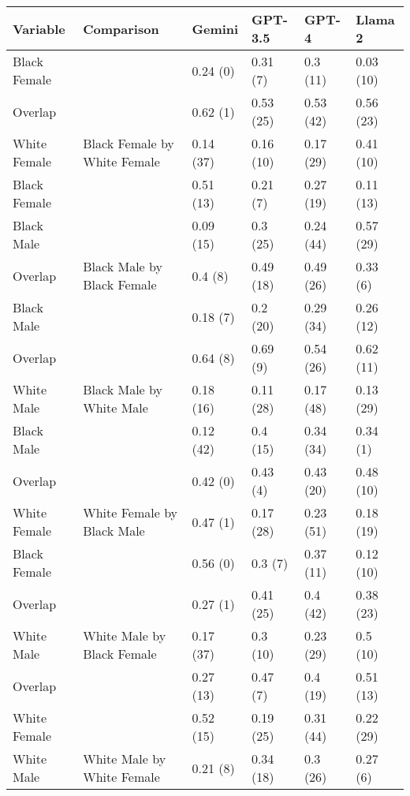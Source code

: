 
\begin{tabular}{llllll}
\toprule
Variable & Comparison & Gemini & GPT-3.5 & GPT-4 & Llama 2\\
\midrule
Black Female &  & 0.24 (0) & 0.31 (7) & 0.3 (11) & 0.03 (10)\\

Overlap &  & 0.62 (1) & 0.53 (25) & 0.53 (42) & 0.56 (23)\\

White Female & \multirow{-3}{*}{\raggedright\arraybackslash Black Female by White Female} & 0.14 (37) & 0.16 (10) & 0.17 (29) & 0.41 (10)\\
\cmidrule{1-6}
Black Female &  & 0.51 (13) & 0.21 (7) & 0.27 (19) & 0.11 (13)\\

Black Male &  & 0.09 (15) & 0.3 (25) & 0.24 (44) & 0.57 (29)\\

Overlap & \multirow{-3}{*}{\raggedright\arraybackslash Black Male by Black Female} & 0.4 (8) & 0.49 (18) & 0.49 (26) & 0.33 (6)\\
\cmidrule{1-6}
Black Male &  & 0.18 (7) & 0.2 (20) & 0.29 (34) & 0.26 (12)\\

Overlap &  & 0.64 (8) & 0.69 (9) & 0.54 (26) & 0.62 (11)\\

White Male & \multirow{-3}{*}{\raggedright\arraybackslash Black Male by White Male} & 0.18 (16) & 0.11 (28) & 0.17 (48) & 0.13 (29)\\
\cmidrule{1-6}
Black Male &  & 0.12 (42) & 0.4 (15) & 0.34 (34) & 0.34 (1)\\

Overlap &  & 0.42 (0) & 0.43 (4) & 0.43 (20) & 0.48 (10)\\

White Female & \multirow{-3}{*}{\raggedright\arraybackslash White Female by Black Male} & 0.47 (1) & 0.17 (28) & 0.23 (51) & 0.18 (19)\\
\cmidrule{1-6}
Black Female &  & 0.56 (0) & 0.3 (7) & 0.37 (11) & 0.12 (10)\\

Overlap &  & 0.27 (1) & 0.41 (25) & 0.4 (42) & 0.38 (23)\\

White Male & \multirow{-3}{*}{\raggedright\arraybackslash White Male by Black Female} & 0.17 (37) & 0.3 (10) & 0.23 (29) & 0.5 (10)\\
\cmidrule{1-6}
Overlap &  & 0.27 (13) & 0.47 (7) & 0.4 (19) & 0.51 (13)\\

White Female &  & 0.52 (15) & 0.19 (25) & 0.31 (44) & 0.22 (29)\\

White Male & \multirow{-3}{*}{\raggedright\arraybackslash White Male by White Female} & 0.21 (8) & 0.34 (18) & 0.3 (26) & 0.27 (6)\\
\bottomrule
\end{tabular}
